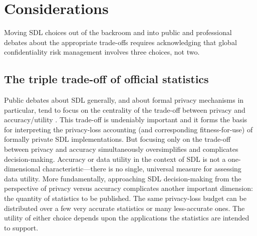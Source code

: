 \section{Considerations}
Moving SDL choices out of the backroom and into public and professional debates about the appropriate trade-offs requires acknowledging that global confidentiality risk management involves three choices, not two.

\subsection{The triple trade-off of official statistics}
Public debates about SDL generally, and about formal privacy mechanisms in particular, tend to focus on the centrality of the trade-off between privacy and accuracy/utility \cite{hotzetal}. This trade-off is undeniably important and it forms the basis for interpreting the privacy-loss accounting (and corresponding fitness-for-use) of formally private SDL implementations. But focusing only on the trade-off between privacy and accuracy simultaneously oversimplifies and complicates decision-making. Accuracy or data utility in the context of SDL is not a one-dimensional characteristic---there is no single, universal measure for assessing data utility. %
More fundamentally, approaching SDL decision-making from the perspective of privacy versus accuracy complicates another important dimension: the quantity of statistics to be published. The same privacy-loss budget can be distributed over a few very accurate statistics or many less-accurate ones. The utility of either choice depends upon the applications the statistics are intended to support.

